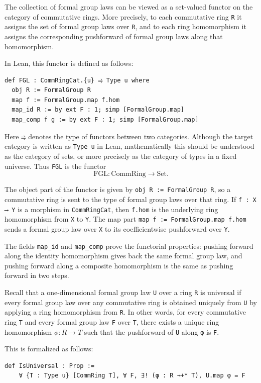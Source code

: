 The collection of formal group laws can be viewed as a set-valued functor
on the category of commutative rings.  More precisely, to each
commutative ring \lstinline|R| it assigns the set of formal group laws
over \lstinline|R|, and to each ring homomorphism it assigns the
corresponding pushforward of formal group laws along that homomorphism.

In Lean, this functor is defined as follows:
\begin{lstlisting}
def FGL : CommRingCat.{u} ⥤ Type u where
  obj R := FormalGroup R
  map f := FormalGroup.map f.hom
  map_id R := by ext F : 1; simp [FormalGroup.map]
  map_comp f g := by ext F : 1; simp [FormalGroup.map]
\end{lstlisting}

Here \lstinline|⥤| denotes the type of functors between two categories.
Although the target category is written as \lstinline|Type u| in Lean,
mathematically this should be understood as the category of sets, or more
precisely as the category of types in a fixed universe.  Thus
\lstinline|FGL| is the functor
\[
  \mathrm{FGL} : \mathrm{CommRing} \to \mathrm{Set}.
\]

The object part of the functor is given by
\lstinline|obj R := FormalGroup R|, so a commutative ring is sent to the
type of formal group laws over that ring.  If
\lstinline|f : X ⟶ Y| is a morphism in \lstinline|CommRingCat|, then
\lstinline|f.hom| is the underlying ring homomorphism from \lstinline|X|
to \lstinline|Y|.  The map part
\lstinline|map f := FormalGroup.map f.hom| sends a formal group law over
\lstinline|X| to its coefficientwise pushforward over \lstinline|Y|.

The fields \lstinline|map_id| and \lstinline|map_comp| prove the functorial
properties: pushing forward along the identity homomorphism gives back the
same formal group law, and pushing forward along a composite homomorphism
is the same as pushing forward in two steps.

Recall that a one-dimensional formal group law \lstinline|U| over a ring
\lstinline|R| is universal if every formal group law over any
commutative ring is obtained uniquely from \lstinline|U| by applying a
ring homomorphism from \lstinline|R|.  In other words, for every
commutative ring \lstinline|T| and every formal group law \lstinline|F|
over \lstinline|T|, there exists a unique ring homomorphism
$\phi : R \to T$
such that the pushforward of \lstinline|U| along \lstinline|φ| is
\lstinline|F|.

This is formalized as follows:
\begin{lstlisting}
def IsUniversal : Prop :=
    ∀ {T : Type u} [CommRing T], ∀ F, ∃! (φ : R →+* T), U.map φ = F
\end{lstlisting}

